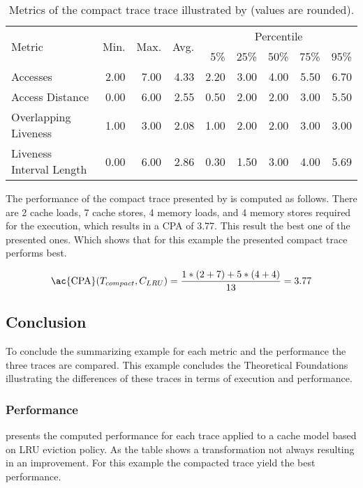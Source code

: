 \documentclass[onecolumn, openright, master, english, signatures]{dbrgrptt}
\begin{document}
\begin{table}[!ht]
  \centering
  \begin{tabular}{lrrrrrrrr}
    \hline
    \multirow{2}{*}{Metric} & \multirow{2}{*}{Min.} & \multirow{2}{*}{Max.} & \multirow{2}{*}{Avg.} & \multicolumn{5}{c}{Percentile} \tabularnewline
    & & & & 5\% & 25\% & 50\% & 75\% & 95\% \tabularnewline
    \hline
    Accesses                 & 2.00 & 7.00 & 4.33 & 2.20 & 3.00 & 4.00 & 5.50 & 6.70 \\
    Access Distance          & 0.00 & 6.00 & 2.55 & 0.50 & 2.00 & 2.00 & 3.00 & 5.50 \\
    Overlapping Liveness        & 1.00 & 3.00 & 2.08 & 1.00 & 2.00 & 2.00 & 3.00 & 3.00 \\
    Liveness Interval Length & 0.00 & 6.00 & 2.86 & 0.30 & 1.50 & 3.00 & 4.00 & 5.69 \\
    \hline
  \end{tabular}
  \caption{Metrics of the compact trace \ac{trace} illustrated by  (values are rounded).}
  \label{tab:summarizing-example-metrics-compact}
\end{table}

The performance of the compact trace presented by  is computed as follows. There are 2 cache loads, 7 cache stores, 4 memory loads, and 4 memory stores required for the execution, which results in a \ac{CPA} of 3.77. This result the best one of the presented ones. Which shows that for this example the presented compact trace performs best.

\begin{equation}\label{equ:trace-transformation-compact-marked}
\text{\ac{CPA}}(T_{compact}, C_{LRU}) = \frac{1 * (2 + 7) + 5 * (4 + 4)}{13} = 3.77
\end{equation}

\subsection{Conclusion}
To conclude the summarizing example for each metric and the performance the three \ac{trace}s are compared. This example concludes the Theoretical Foundations illustrating the differences of these \ac{trace}s in terms of execution and performance.

\subsubsection{Performance}
 presents the computed performance for each \ac{trace} applied to a cache model based on \ac{LRU} eviction policy. As the table shows a transformation not always resulting in an improvement. For this example the compacted \ac{trace} yield the best performance.
\end{document}
